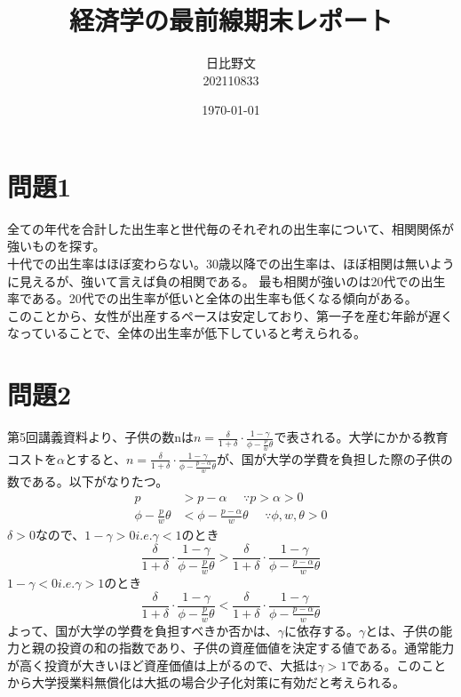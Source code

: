 \documentclass[a4paper,12pt]{ltjsarticle}
\begin{document}
\title{経済学の最前線期末レポート}
\author{日比野文\\202110833}
\date{\today}

\maketitle

\section*{問題1}
全ての年代を合計した出生率と世代毎のそれぞれの出生率について、相関関係が強いものを探す。\\
十代での出生率はほぼ変わらない。30歳以降での出生率は、ほぼ相関は無いように見えるが、強いて言えば負の相関である。
最も相関が強いのは20代での出生率である。20代での出生率が低いと全体の出生率も低くなる傾向がある。\\
このことから、女性が出産するペースは安定しており、第一子を産む年齢が遅くなっていることで、全体の出生率が低下していると考えられる。
\section*{問題2}
第5回講義資料より、子供の数nは$n=\frac{\delta}{1+\delta}\cdot\frac{1-\gamma}{\phi-\frac{p}{w}\theta}$で表される。大学にかかる教育コストを$\alpha$とすると、$n=\frac{\delta}{1+\delta}\cdot\frac{1-\gamma}{\phi-\frac{p-\alpha}{w}\theta}$が、国が大学の学費を負担した際の子供の数である。以下がなりたつ。
\begin{align*}
    p &> p-\alpha\ \ \ \ \ \ \because p>\alpha>0\\
    \phi-\frac{p}{w}\theta &< \phi-\frac{p-\alpha}{w}\theta\ \ \ \ \ \ \because \phi,w,\theta>0
\end{align*}
$\delta>0$なので、$1-\gamma>0 i.e. \gamma<1$のとき
$$
\frac{\delta}{1+\delta}\cdot\frac{1-\gamma}{\phi-\frac{p}{w}\theta}>\frac{\delta}{1+\delta}\cdot\frac{1-\gamma}{\phi-\frac{p-\alpha}{w}\theta}
$$
$1-\gamma<0 i.e. \gamma>1$のとき
$$
\frac{\delta}{1+\delta}\cdot\frac{1-\gamma}{\phi-\frac{p}{w}\theta}<\frac{\delta}{1+\delta}\cdot\frac{1-\gamma}{\phi-\frac{p-\alpha}{w}\theta}
$$
よって、国が大学の学費を負担すべきか否かは、$\gamma$に依存する。$\gamma$とは、子供の能力と親の投資の和の指数であり、子供の資産価値を決定する値である。通常能力が高く投資が大きいほど資産価値は上がるので、大抵は$\gamma>1$である。このことから大学授業料無償化は大抵の場合少子化対策に有効だと考えられる。
\end{document}
